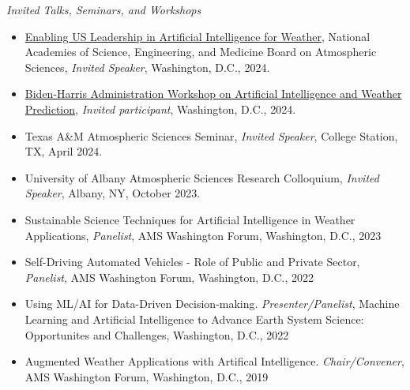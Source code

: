 \documentclass[11pt,letterpaper]{article}
\newcommand{\mhead}[1]{\leavevmode\marginpar{\sffamily\footnotesize #1}}
\begin{document}
\bigskip
\mhead{Presentations \newline and \newline Talks}%

\emph{Invited Talks, Seminars, and Workshops}
\medskip
\begin{itemize}[itemindent=-10pt]

 \item \href{https://www.nationalacademies.org/event/42497_05-2024_enabling-us-leadership-in-artificial-intelligence-for-weather}{Enabling US Leadership in Artificial Intelligence for Weather}, National Academies of Science, Engineering, and Medicine Board on Atmospheric Sciences, \textit{Invited Speaker}, Washington, D.C., 2024.

 \item \href{https://www.whitehouse.gov/ostp/news-updates/2024/05/10/readout-biden-harris-administration-workshop-on-artificial-intelligence-and-weather-prediction/}{Biden-⁠Harris Administration Workshop on Artificial Intelligence and Weather Prediction}, \textit{Invited participant}, Washington, D.C., 2024.

 \item Texas A\&M Atmospheric Sciences Seminar, \textit{Invited Speaker}, College Station, TX, April 2024.

 \item University of Albany Atmospheric Sciences Research Colloquium, \textit{Invited Speaker}, Albany, NY, October 2023.

 \item Sustainable Science Techniques for Artificial Intelligence in Weather Applications, \textit{Panelist}, AMS Washington Forum, Washington, D.C., 2023

 \item Self-Driving Automated Vehicles - Role of Public and Private Sector, \textit{Panelist}, AMS Washington Forum, Washington, D.C., 2022
 
 \item Using ML/AI for Data-Driven Decision-making. \textit{Presenter/Panelist}, Machine Learning and Artificial Intelligence to Advance Earth System Science: Opportunites and Challenges, Washington, D.C., 2022
 
 \item Augmented Weather Applications with Artifical Intelligence. \textit{Chair/Convener}, AMS Washington Forum, Washington, D.C., 2019


\end{itemize}
\end{document}

